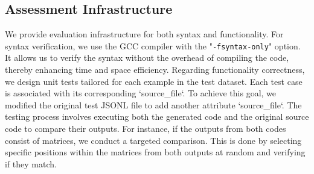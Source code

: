 \subsection{Assessment Infrastructure}\label{subsec:benchmark_syntax}

We provide evaluation infrastructure for both syntax and functionality.
For syntax verification, we use the GCC compiler with the "\texttt{-fsyntax-only}" option. It allows us to verify the syntax without the overhead of compiling the code, thereby enhancing time and space efficiency.
Regarding functionality correctness, we design unit tests tailored for each example in the test dataset. Each test case is associated with its corresponding `source\_file`. To achieve this goal, we modified the original test JSONL file to add another attribute `source\_file`. 
The testing process involves executing both the generated code and the original source code to compare their outputs. 
For instance, if the outputs from both codes consist of matrices, we conduct a targeted comparison.
This is done by selecting specific positions within the matrices from both outputs at random and verifying if they match.
